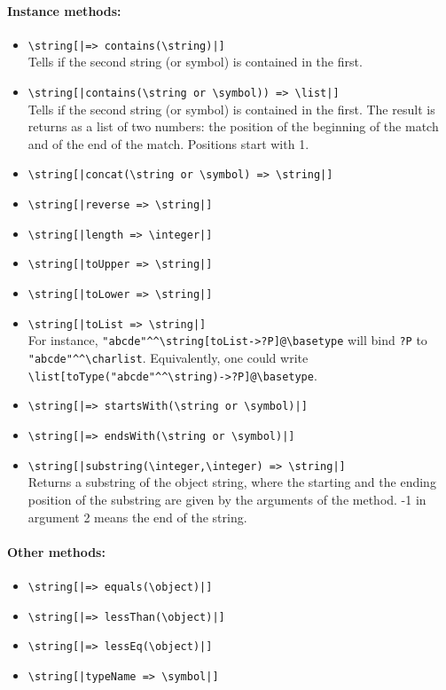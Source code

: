 \documentclass[11pt]{article}
\newcommand{\bs}{\textbackslash}
\begin{document}
\paragraph{Instance  methods:}
\begin{itemize}
\item {\tt \bs{}string[|=> contains(\bs{}string)|]}  
  \\
  Tells if the second string (or symbol) is contained in the first.
\item {\tt \bs{}string[|contains(\bs{}string \textnormal{or} \bs{}symbol)) => \bs{}list|]}  
  \\
  Tells if the second string (or symbol) is contained in the first. The
  result is returns as a list of two numbers: the position of the beginning of
  the match and of the end of the match. Positions start with 1.
\item {\tt \bs{}string[|concat(\bs{}string \textnormal{or} \bs{}symbol) => \bs{}string|]}  
\item {\tt \bs{}string[|reverse => \bs{}string|]}  
\item {\tt \bs{}string[|length => \bs{}integer|]}  
\item {\tt \bs{}string[|toUpper => \bs{}string|]}  
\item {\tt \bs{}string[|toLower => \bs{}string|]}  
\item {\tt \bs{}string[|toList => \bs{}string|]}  \\
  For instance, \verb|"abcde"^^\string[toList->?P]@\basetype| will bind
  \texttt{?P} to \verb|"abcde"^^\charlist|. Equivalently, one could write
  \verb|\list[toType("abcde"^^\string)->?P]@\basetype|.
\item {\tt \bs{}string[|=> startsWith(\bs{}string \textnormal{or} \bs{}symbol)|]}  
\item {\tt \bs{}string[|=> endsWith(\bs{}string \textnormal{or} \bs{}symbol)|]}  
\item {\tt \bs{}string[|substring(\bs{}integer,\bs{}integer) => \bs{}string|]}  
  \\
  Returns a substring of the object string, where the starting and the
  ending position of the substring are given by the arguments of the
  method. -1 in argument 2 means the end of the string.
\end{itemize}

\paragraph{Other methods:}
\begin{itemize}
\item {\tt \bs{}string[|=> equals(\bs{}object)|]}  
\item {\tt \bs{}string[|=> lessThan(\bs{}object)|]}  
\item {\tt \bs{}string[|=> lessEq(\bs{}object)|]}  
\item {\tt \bs{}string[|typeName => \bs{}symbol|]}  
\end{itemize}
\end{document}
